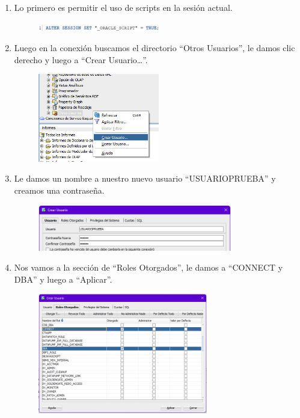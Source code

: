 \documentclass{templateNote}
\begin{document}
\begin{enumerate}
    \item Lo primero es permitir el uso de scripts en la sesión actual.
    \begin{figure}[H]
        \centering
        \includegraphics[width=0.5\textwidth]{img/image1.png}
    \end{figure}

    \item Luego en la conexión buscamos el directorio “Otros Usuarios”, le damos clic derecho y luego a “Crear Usuario…”.
    \begin{figure}[H]
        \centering
        \includegraphics[width=0.5\textwidth]{img/image2.png}
    \end{figure}

    \item Le damos un nombre a nuestro nuevo usuario “USUARIOPRUEBA” y creamos una contraseña.
    \begin{figure}[H]
        \centering
        \includegraphics[width=0.8\textwidth]{img/image3.png}
    \end{figure}

    \newpage
    \item Nos vamos a la sección de “Roles Otorgados”, le damos a “CONNECT y DBA” y luego a “Aplicar”.
    \begin{figure}[H]
        \centering
        \includegraphics[width=0.7\textwidth]{img/image4.png}
    \end{figure}


\end{enumerate}
\end{document}
